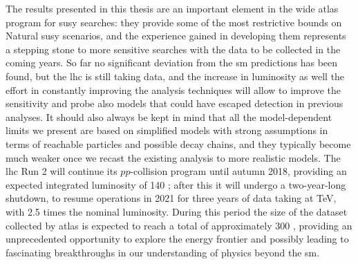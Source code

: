 The results presented in this thesis are an important element in the wide \gls{atlas} program 
for \gls{susy} searches: they  
provide some of the most restrictive bounds on Natural \gls{susy} scenarios, 
and the experience gained in developing them represents a stepping stone to more sensitive searches 
with the data to be collected in the coming years.
So far no significant deviation from the \gls{sm} predictions has been found,
but the \gls{lhc} is still taking data, and the increase in luminosity
as well the effort in constantly improving the analysis techniques 
will allow to improve the sensitivity and probe also models that could have 
escaped detection in previous analyses. 
It should also always be kept in mind that all the model-dependent limits we present are 
based on simplified models with strong assumptions in terms of reachable particles and 
possible decay chains, and they typically become much weaker once we recast the existing analysis 
to more realistic models. 
The \gls{lhc} Run 2 will continue its $pp$-collision program until autumn 2018, 
providing an expected integrated luminosity of 140 \ifb; 
after this it will undergo a two-year-long shutdown, to resume operations 
in 2021 for three years of data taking at \cmfour TeV, with 2.5 times the 
nominal luminosity. 
During this period the size of the dataset collected by \gls{atlas} is expected to reach a total of approximately 300 \ifb, providing an unprecedented opportunity to explore the energy frontier and possibly leading to fascinating breakthroughs in our understanding of physics beyond the \gls{sm}. 
 

 

\clearpage 



